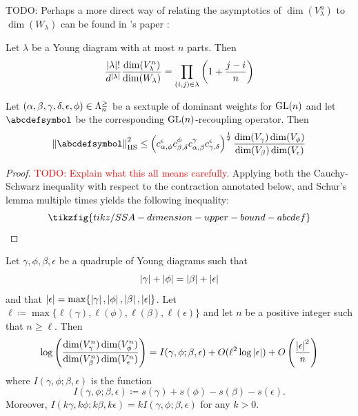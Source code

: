 \documentclass[notitlepage, 10pt]{article}
\begin{document}
{\color{red}
TODO: Perhaps a more direct way of relating the asymptotics of $\dim(V_{\lambda}^{n})$ to $\dim(W_{\lambda})$ can be found in \citeauthor{harrow2023approximate}'s paper \cite[Lemma 2]{harrow2023approximate}:
}
\begin{lem}
    Let $\lambda$ be a Young diagram with at most $n$ parts. Then
    \begin{equation}
        \frac{\left|\lambda\right|!}{d^{\left|\lambda\right|}} \frac{\dim(V_{\lambda}^{n})}{\dim(W_{\lambda})} = \prod_{(i,j) \in \lambda} \left(1 + \frac{j-i}{n}\right)
    \end{equation}
\end{lem}
\begin{thm}
    \label{thm:ud_recouple_bound}
    Let $(\alpha,\beta,\gamma,\delta,\epsilon,\phi) \in \Lambda^{\geq}_{n}$ be a sextuple of dominant weights for $\operatorname{GL}(n)$ and let $\abcdefsymbol$ be the corresponding $\operatorname{GL}(n)$-recoupling operator. 
    Then
    \begin{equation}
        \norm{\abcdefsymbol}_{\text{HS}}^{2}
        \leq \left(c_{\alpha,\phi}^{\epsilon}c_{\beta,\delta}^{\phi}c_{\alpha,\beta}^{\gamma}c_{\gamma,\delta}^{\epsilon}\right)^{\frac{1}{2}} \frac{\dim(V_{\gamma}) \dim(V_{\phi})}{\dim(V_{\beta}) \dim(V_{\epsilon})}
    \end{equation}
\end{thm}
\begin{proof}
    \textcolor{red}{TODO: Explain what this all means carefully.}
    Applying both the Cauchy-Schwarz inequality with respect to the contraction annotated below, and Schur's lemma multiple times yields the following inequality:
    \begin{equation}
        \tikzfig{tikz/SSA-dimension-upper-bound-abcdef}
    \end{equation}
\end{proof}
\begin{lem}
    \label{lem:asymptotic_dimension_ratio}
    Let $\gamma,\phi,\beta,\epsilon$ be a quadruple of Young diagrams such that 
    \begin{equation}
        \label{eq:balanced_sizes}
        \left|\gamma\right|+\left|\phi\right| = \left|\beta\right|+\left|\epsilon\right|
    \end{equation}
    and that $\left|\epsilon\right| = \max\{\left|\gamma\right|, \left|\phi\right|, \left|\beta\right|, \left|\epsilon\right|\}$.
    Let $\ell \coloneqq \max\{\ell(\gamma), \ell(\phi), \ell(\beta), \ell(\epsilon) \}$ and let $n$ be a positive integer such that $n \geq \ell$.
    Then
    \begin{equation}
        \log\left(\frac{\dim(V_{\gamma}^n) \dim(V_{\phi}^n)}{\dim(V_{\beta}^n) \dim(V_{\epsilon}^n)}\right)
        = I(\gamma,\phi;\beta,\epsilon) + O(\ell^2 \log \left|\epsilon\right|) + O\left(\frac{\left|\epsilon\right|^2}{n}\right)
        \label{eq:asymptotic_dimension_ratio}
    \end{equation}
    where $I(\gamma,\phi;\beta,\epsilon)$ is the function
    \begin{equation}
        I(\gamma,\phi;\beta,\epsilon) \coloneqq s(\gamma) + s(\phi) - s(\beta) - s(\epsilon).
    \end{equation}
    Moreover, $I(k\gamma,k\phi;k\beta,k\epsilon) = k I(\gamma,\phi;\beta,\epsilon)$ for any $k > 0$.
\end{lem}
\end{document}
